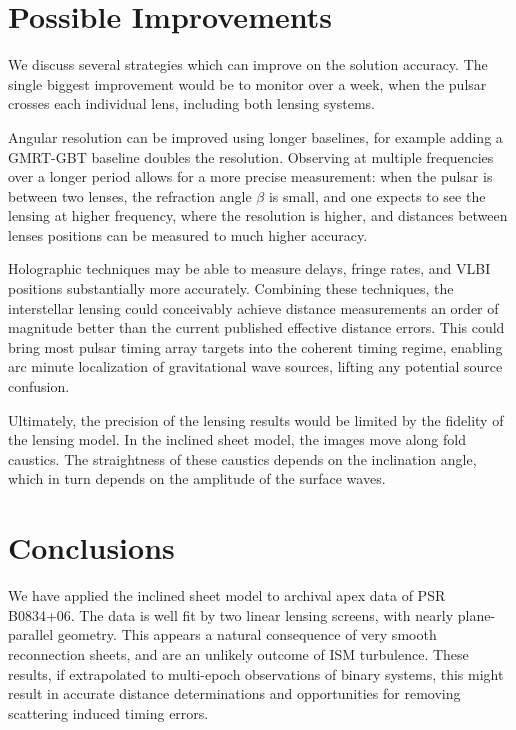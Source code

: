 \documentclass[useAMS,usenatbib]{mn2e}
\begin{document}
\section{Possible Improvements}

We discuss several strategies which can improve on the solution
accuracy.  The single biggest improvement would be to monitor over a
week, when the pulsar crosses each individual lens, including both
lensing systems.

Angular resolution can be improved using longer baselines, for example
adding a GMRT-GBT baseline doubles the resolution.  Observing at
multiple frequencies over a longer period allows for a more precise
measurement: when the pulsar is between two lenses, the refraction
angle $\beta$ is small, and one expects to see the lensing at higher
frequency, where the resolution is higher, and distances between
lenses positions can be measured to much higher accuracy.

Holographic techniques \citep{2008MNRAS.388.1214W,2014MNRAS.440L..36P}
may be able to measure delays, fringe rates, and VLBI positions
substantially more accurately.  Combining these techniques, the
interstellar lensing could conceivably achieve distance measurements
an order of magnitude better than the current published effective
distance errors.  This could bring most pulsar timing array targets
into the coherent timing regime, enabling arc minute localization of
gravitational wave sources, lifting any potential source confusion.

Ultimately, the precision of the lensing results would be limited by
the fidelity of the lensing model.  In the inclined sheet model, the
images move along fold caustics.  The straightness of these caustics
depends on the inclination angle, which in turn depends on the
amplitude of the surface waves.  

\section{Conclusions}

We have applied the \citep{2014MNRAS.442.3338P} inclined
sheet model to archival apex data of PSR B0834+06.  The data is well
fit by two linear lensing screens, with nearly plane-parallel
geometry.  This appears a natural consequence of very smooth
reconnection sheets, and are an unlikely outcome of ISM turbulence.
These results, if extrapolated to multi-epoch observations of binary
systems, this might result in accurate distance determinations and
opportunities for removing scattering induced timing errors.
\end{document}

